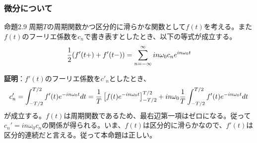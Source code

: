 \documentclass[dvipdfmx, 9pt, a4paper]{jsarticle}
\begin{document}
\subsubsection{微分について}
\begin{itembox}[l]{命題2.9}
周期$T$の周期関数かつ区分的に滑らかな関数として$f(t)$を考える。また$f(t)$のフーリエ係数を$c_n$で書き表すとしたとき、以下の等式が成立する。
\begin{equation}
\frac{1}{2}(f'(t+)+f'(t-))=\sum_{n=-\infty}^\infty in\omega_0c_ne^{in\omega_0t} \notag
\end{equation}
\end{itembox}
{\bf 証明}：$f'(t)$のフーリエ係数を$c'_n$としたとき、
\begin{equation}
c_n'=\int_{-T/2}^{T/2}f'(t)e^{-in\omega_0t}dt=\frac{1}{T}\left[ f(t)e^{-in\omega_0t} \right]_{-T/2}^{T/2}+in\omega_0\frac{1}{T}\int_{-T/2}^{T/2}f'(t)e^{-in\omega_0t}dt \notag
\end{equation}
が成立する。$f(t)$は周期関数であるため、最右辺第一項はゼロになる。従って$c_n'=in\omega_0c_n$の関係が得られる。いま、$f(t)$は区分的に滑らかなので、$f'(t)$は区分的連続だと言える。従って本命題は正しい。
\end{document}
